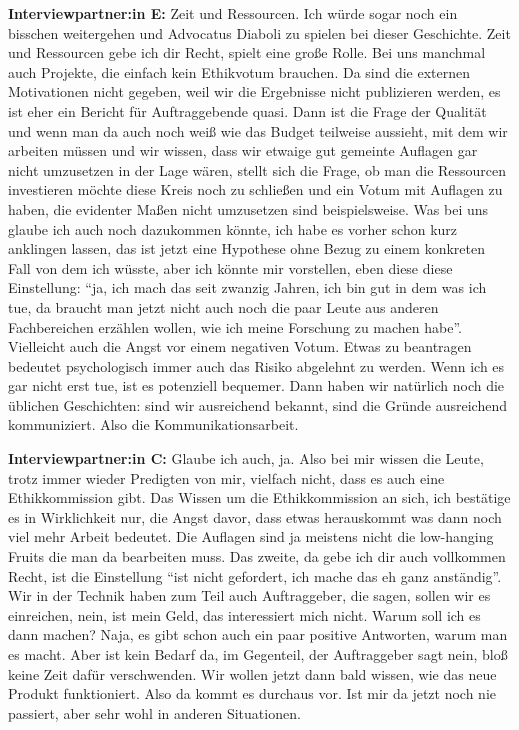 \documentclass[a4paper,12pt,twoside]{scrreprt}
\begin{document}
\textbf{Interviewpartner:in E:} Zeit und Ressourcen. Ich würde sogar noch ein bisschen weitergehen und Advocatus Diaboli zu spielen bei dieser Geschichte. Zeit und Ressourcen gebe ich dir Recht, spielt eine große Rolle. Bei uns manchmal auch Projekte, die einfach kein Ethikvotum brauchen. Da sind die externen Motivationen nicht gegeben, weil wir die Ergebnisse nicht publizieren werden, es ist eher ein Bericht für Auftraggebende quasi. Dann ist die Frage der Qualität und wenn man da auch noch weiß wie das Budget teilweise aussieht, mit dem wir arbeiten müssen und wir wissen, dass wir etwaige gut gemeinte Auflagen gar nicht umzusetzen in der Lage wären, stellt sich die Frage, ob man die Ressourcen investieren möchte diese Kreis noch zu schließen und ein Votum mit Auflagen zu haben, die evidenter Maßen nicht umzusetzen sind beispielsweise. Was bei uns glaube ich auch noch dazukommen könnte, ich habe es vorher schon kurz anklingen lassen, das ist jetzt eine Hypothese ohne Bezug zu einem konkreten Fall von dem ich wüsste, aber ich könnte mir vorstellen, eben diese diese Einstellung: \enquote{ja, ich mach das seit zwanzig Jahren, ich bin gut in dem was ich tue, da braucht man jetzt nicht auch noch die paar Leute aus anderen Fachbereichen erzählen wollen, wie ich meine Forschung zu machen habe}. Vielleicht auch die Angst vor einem negativen Votum. Etwas zu beantragen bedeutet psychologisch immer auch das Risiko abgelehnt zu werden. Wenn ich es gar nicht erst tue, ist es potenziell bequemer. Dann haben wir natürlich noch die üblichen Geschichten: sind wir ausreichend bekannt, sind die Gründe ausreichend kommuniziert. Also die Kommunikationsarbeit.

\textbf{Interviewpartner:in C:} Glaube ich auch, ja. Also bei mir wissen die Leute, trotz immer wieder Predigten von mir, vielfach nicht, dass es auch eine Ethikkommission gibt. Das Wissen um die Ethikkommission an sich, ich bestätige es in Wirklichkeit nur, die Angst davor, dass etwas herauskommt was dann noch viel mehr Arbeit bedeutet. Die Auflagen sind ja meistens nicht die low-hanging Fruits die man da bearbeiten muss. Das zweite, da gebe ich dir auch vollkommen Recht, ist die Einstellung \enquote{ist nicht gefordert, ich mache das eh ganz anständig}. Wir in der Technik haben zum Teil auch Auftraggeber, die sagen, sollen wir es einreichen, nein, ist mein Geld, das interessiert mich nicht. Warum soll ich es dann machen? Naja, es gibt schon auch ein paar positive Antworten, warum man es macht. Aber ist kein Bedarf da, im Gegenteil, der Auftraggeber sagt nein, bloß keine Zeit dafür verschwenden. Wir wollen jetzt dann bald wissen, wie das neue Produkt funktioniert. Also da kommt es durchaus vor. Ist mir da jetzt noch nie passiert, aber sehr wohl in anderen Situationen.
\end{document}
